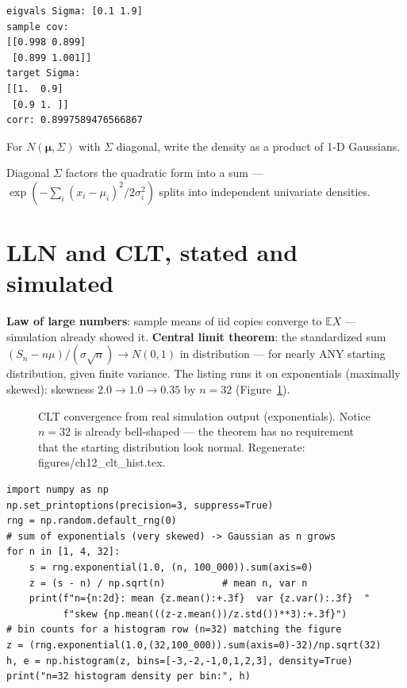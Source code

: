 \begin{lstlisting}[caption={Output of the spectral sampler. Notice the
200k-sample covariance matches $\Sigma$ to a percent ---
$Q\Lambda^{1/2}\mathbf z$ really manufactures correlated Gaussians.}]
eigvals Sigma: [0.1 1.9]
sample cov:
[[0.998 0.899]
 [0.899 1.001]]
target Sigma:
[[1.  0.9]
 [0.9 1. ]]
corr: 0.8997589476566867
\end{lstlisting}

\begin{exercise}[easy]
For $N(\boldsymbol\mu,\Sigma)$ with $\Sigma$ diagonal, write the density
as a product of 1-D Gaussians.
\begin{solution}
Diagonal $\Sigma$ factors the quadratic form into a sum ---
$\exp(-\sum_i(x_i-\mu_i)^2/2\sigma_i^2)$ splits into independent
univariate densities.
\end{solution}
\end{exercise}

\section{LLN and CLT, stated and simulated}\label{sec:prob-clt}

\textbf{Law of large numbers}: sample means
of iid copies converge to $\mathbb E X$ --- simulation already showed it.
\textbf{Central limit theorem}: the
standardized sum $(S_n-n\mu)/(\sigma\sqrt n)\to N(0,1)$ in distribution
--- for nearly ANY starting distribution, given finite variance. The
listing runs it on exponentials (maximally skewed): skewness $2.0\to
1.0\to0.35$ by $n=32$ (Figure~\ref{fig:clthist}).

\begin{figure}[htbp]
\centering

\caption{CLT convergence from real simulation output (exponentials).
Notice $n=32$ is already bell-shaped --- the theorem has no requirement
that the starting distribution look normal. Regenerate:
\ttfamily figures/ch12\_clt\_hist.tex.}
\label{fig:clthist}
\end{figure}

\begin{lstlisting}[caption={\ttfamily code/ch12\_clt.py --- the CLT
simulated: standardized sums of exponentials, with the skewness decay
printed.}]
import numpy as np
np.set_printoptions(precision=3, suppress=True)
rng = np.random.default_rng(0)
# sum of exponentials (very skewed) -> Gaussian as n grows
for n in [1, 4, 32]:
    s = rng.exponential(1.0, (n, 100_000)).sum(axis=0)
    z = (s - n) / np.sqrt(n)          # mean n, var n
    print(f"n={n:2d}: mean {z.mean():+.3f}  var {z.var():.3f}  "
          f"skew {np.mean(((z-z.mean())/z.std())**3):+.3f}")
# bin counts for a histogram row (n=32) matching the figure
z = (rng.exponential(1.0,(32,100_000)).sum(axis=0)-32)/np.sqrt(32)
h, e = np.histogram(z, bins=[-3,-2,-1,0,1,2,3], density=True)
print("n=32 histogram density per bin:", h)
\end{lstlisting}

